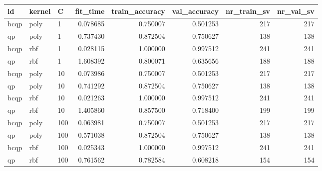 \begin{tabular}{lllrrrrr}
\toprule
  ld & kernel &   C &  fit\_time &  train\_accuracy &  val\_accuracy &  nr\_train\_sv &  nr\_val\_sv \\
\midrule
bcqp &   poly &   1 &  0.078685 &        0.750007 &      0.501253 &          217 &        217 \\
  qp &   poly &   1 &  0.737430 &        0.872504 &      0.750627 &          138 &        138 \\
bcqp &    rbf &   1 &  0.028115 &        1.000000 &      0.997512 &          241 &        241 \\
  qp &    rbf &   1 &  1.608392 &        0.800071 &      0.635656 &          188 &        188 \\
bcqp &   poly &  10 &  0.073986 &        0.750007 &      0.501253 &          217 &        217 \\
  qp &   poly &  10 &  0.741292 &        0.872504 &      0.750627 &          138 &        138 \\
bcqp &    rbf &  10 &  0.021263 &        1.000000 &      0.997512 &          241 &        241 \\
  qp &    rbf &  10 &  1.405860 &        0.857500 &      0.718400 &          199 &        199 \\
bcqp &   poly & 100 &  0.063981 &        0.750007 &      0.501253 &          217 &        217 \\
  qp &   poly & 100 &  0.571038 &        0.872504 &      0.750627 &          138 &        138 \\
bcqp &    rbf & 100 &  0.025343 &        1.000000 &      0.997512 &          241 &        241 \\
  qp &    rbf & 100 &  0.761562 &        0.782584 &      0.608218 &          154 &        154 \\
\bottomrule
\end{tabular}
